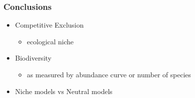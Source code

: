 \documentclass{beamer}
\begin{document}
\begin{frame}
\frametitle{Conclusions}
\begin{itemize}
\item Competitive Exclusion
\begin{itemize}
\item ecological niche
\end{itemize}
\pause
\item Biodiversity
\begin{itemize}
\item as measured by abundance curve or number of species
\end{itemize}
\pause
\item Niche models vs Neutral models
\end{itemize}
\end{frame}

\fi%
\end{document}
